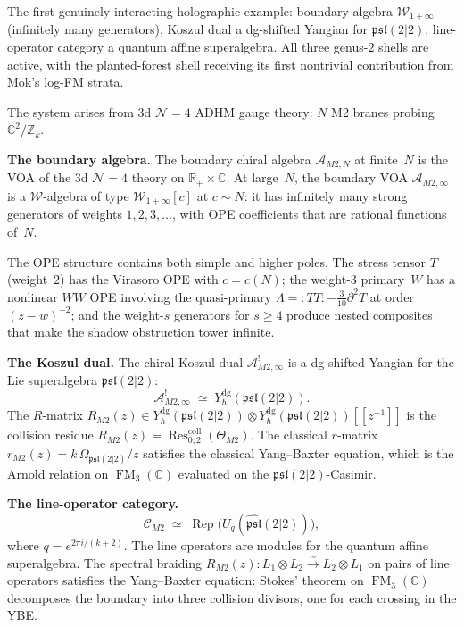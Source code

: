 \documentclass[11pt]{report}
\theoremstyle{definition}
\theoremstyle{remark}
\providecommand{\cA}{\mathcal{A}}
\providecommand{\cC}{\mathcal{C}}
\providecommand{\cN}{\mathcal{N}}
\numberwithin{equation}{section}
\begin{document}
The first genuinely interacting holographic
example: boundary algebra $\mathcal W_{1+\infty}$
(infinitely many generators), Koszul dual a dg-shifted
Yangian for $\mathfrak{psl}(2|2)$,
line-operator category a quantum affine superalgebra. All three
genus-$2$ shells are active, with the
planted-forest shell receiving its
first nontrivial contribution from Mok's log-FM strata.

The system arises from
3d $\cN=4$ ADHM gauge theory: $N$ M2 branes probing
$\mathbb C^2/\mathbb Z_k$.

\medskip
\noindent\textbf{The boundary algebra.}
The boundary chiral algebra $\cA_{M2,N}$ at finite~$N$ is the VOA
of the 3d $\cN=4$ theory on $\mathbb R_+\times\mathbb C$. At
large~$N$, the boundary VOA $\cA_{M2,\infty}$ is a $\mathcal W$-algebra
of type $\mathcal W_{1+\infty}[c]$ at $c\sim N$: it has infinitely
many strong generators of weights $1,2,3,\dots$, with OPE
coefficients that are rational functions of~$N$.

The OPE structure contains both simple and higher poles. The
stress tensor $T$ (weight~$2$) has the Virasoro OPE with
$c=c(N)$; the weight-$3$ primary~$W$ has a nonlinear $WW$ OPE
involving the quasi-primary $\Lambda={:}TT{:}-\frac{3}{10}\partial^2T$
at order $(z-w)^{-2}$; and the weight-$s$ generators for $s\ge 4$
produce nested composites that make the shadow obstruction tower infinite.

\medskip
\noindent\textbf{The Koszul dual.}
The chiral Koszul dual $\cA^!_{M2,\infty}$ is a dg-shifted Yangian
for the Lie superalgebra $\mathfrak{psl}(2|2)$:
\[
\cA^!_{M2,\infty}
\;\simeq\;
Y^{\mathrm{dg}}_{\hbar}(\mathfrak{psl}(2|2)).
\]
The $R$-matrix
$R_{M2}(z)\in Y^{\mathrm{dg}}_\hbar(\mathfrak{psl}(2|2))
\otimes Y^{\mathrm{dg}}_\hbar(\mathfrak{psl}(2|2))[[z^{-1}]]$
is the collision residue
$R_{M2}(z)=\operatorname{Res}^{\mathrm{coll}}_{0,2}(\Theta_{M2})$.
The classical $r$-matrix $r_{M2}(z)=k\,\Omega_{\mathfrak{psl}(2|2)}/z$
satisfies the classical Yang--Baxter equation, which is the Arnold
relation on $\operatorname{FM}_3(\mathbb C)$ evaluated on the
$\mathfrak{psl}(2|2)$-Casimir.

\medskip
\noindent\textbf{The line-operator category.}
\[
\cC_{M2}
\;\simeq\;
\operatorname{Rep}\!\bigl(
U_q(\widehat{\mathfrak{psl}}(2|2))
\bigr),
\]
where $q=e^{2\pi i/(k+2)}$. The line operators are modules for the
quantum affine superalgebra. The spectral braiding
$R_{M2}(z)\colon L_1\otimes L_2\xrightarrow{\sim}L_2\otimes L_1$
on pairs of line operators satisfies the Yang--Baxter equation:
Stokes' theorem on $\operatorname{FM}_3(\mathbb C)$ decomposes
the boundary into three collision divisors, one for each crossing
in the YBE.
\end{document}
